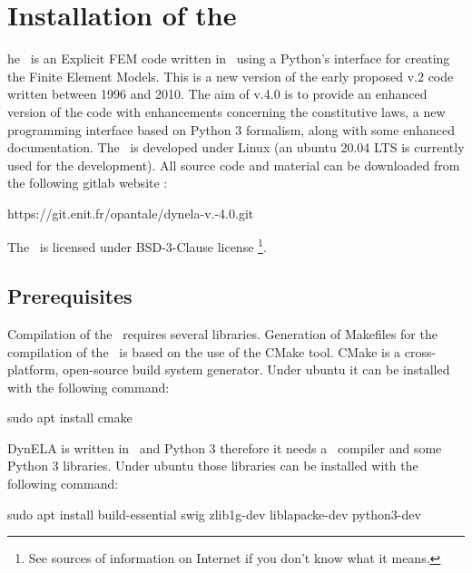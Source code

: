 %
%
%
\chapter{Installation of the \DynELA}\label{Chapter!Installation}

\startcontents[chapters]
\printmyminitoc[1]he \DynELA~is an Explicit FEM code written in \Cpp~using a Python's interface for creating the Finite Element Models. This is a new version of the early proposed v.2 code written between 1996 and 2010. The aim of v.4.0 is to provide an enhanced version of the code with enhancements concerning the constitutive laws, a new programming interface based on Python 3 formalism, along with some enhanced documentation.
The \DynELA~is developed under Linux (an ubuntu 20.04 LTS is currently used for the development). All source code and material can be downloaded from the following gitlab
 website
:

\hspace*{1cm}\textsf{https://git.enit.fr/opantale/dynela-v.-4.0.git}

The \DynELA~is licensed under BSD-3-Clause license \footnote{See sources of information on Internet if you don't know what it means.}.

\section{Prerequisites}

Compilation of the \DynELA~requires several libraries.
Generation of Makefiles for the compilation of the \DynELA~is based on the use of the CMake tool. CMake is a cross-platform, open-source build system generator. Under ubuntu it can be installed with the following command:

\begin{BashListing}[numbers=none]
sudo apt install cmake
\end{BashListing}

DynELA is written in \Cpp~and Python 3 therefore it needs a \Cpp~compiler and some Python 3 libraries. Under ubuntu those libraries can be installed with the following command:

\begin{BashListing}[numbers=none]
sudo apt install build-essential swig zlib1g-dev liblapacke-dev python3-dev
\end{BashListing}

